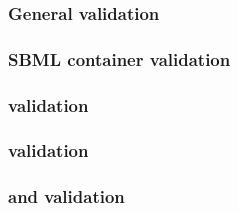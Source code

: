 \begin{sbmlenum}

\end{sbmlenum} \subsubsection*{General  validation} \begin{sbmlenum}


\end{sbmlenum} \subsubsection*{SBML container validation} \begin{sbmlenum}


\end{sbmlenum} \subsubsection*{ validation} \begin{sbmlenum}


\end{sbmlenum} \subsubsection*{ validation} \begin{sbmlenum}


\end{sbmlenum} \subsubsection*{ and  validation} \begin{sbmlenum}





\end{sbmlenum}

